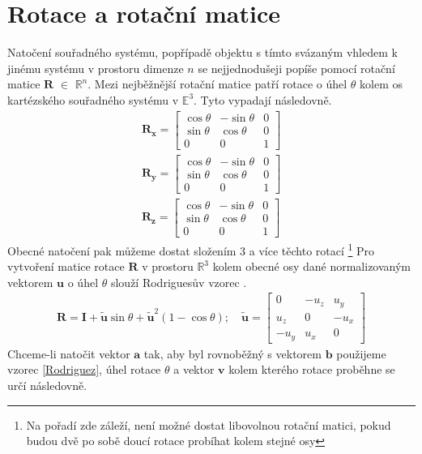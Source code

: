 \documentclass[twoside]{ctuthesis}
\newcommand{\spc}[2]{$\mathbb{#1}^{#2}$}
\newcommand{\tl}[1]{$\mathbf{#1}$}
\begin{document}
\section{Rotace a rotační matice}
Natočení souřadného systému, popřípadě objektu s tímto svázaným vhledem k jinému systému v prostoru dimenze $n$ se nejjednodušeji popíše pomocí rotační matice \tl{R} $\in$ \spc{R}{n}. Mezi nejběžnější rotační matice patří rotace o úhel $\theta$ kolem os kartézského souřadného systému v \spc{E}{3}. Tyto vypadají následovně.
\begin{align}
    \mathbf{R_x}=\begin{bmatrix} \cos \theta & -\sin \theta & 0 \\ \sin \theta & \cos \theta & 0 \\ 0 & 0 & 1 \end{bmatrix} \\
    \mathbf{R_y}=\begin{bmatrix} \cos \theta & -\sin \theta & 0 \\ \sin \theta & \cos \theta & 0 \\ 0 & 0 & 1 \end{bmatrix} \\
    \mathbf{R_z}=\begin{bmatrix} \cos \theta & -\sin \theta & 0 \\ \sin \theta & \cos \theta & 0 \\ 0 & 0 & 1 \end{bmatrix}
\end{align}
Obecné natočení pak můžeme dostat složením 3 a více těchto rotací \footnote{Na pořadí zde záleží, není možné dostat libovolnou rotační matici, pokud budou dvě po sobě doucí rotace probíhat kolem stejné osy}
Pro vytvoření matice rotace \tl{R} v prostoru \spc{R}{3} kolem obecné osy dané normalizovaným vektorem \tl{u} o úhel $\theta$ slouží Rodriguesův vzorec \cite{RodriguesRotationFormula}.
\begin{align}
    \mathbf{R} = \mathbf{I} + \tilde{\mathbf{u}}\sin \theta + \tilde{\mathbf{u}}^2(1 - \cos \theta); \quad \tilde{\mathbf{u}} = \begin{bmatrix} 0 & -u_{z} & u_{y} \\ u_z & 0 & -u_x \\ -u_y & u_x & 0 \end{bmatrix}
    \label{Rodriguez}
\end{align}
Chceme-li natočit vektor \tl{a} tak, aby byl rovnoběžný s vektorem \tl{b} použijeme vzorec \ref{Rodriguez}, úhel rotace $\theta$ a vektor \tl{v} kolem kterého rotace proběhne se určí následovně.
\end{document}
